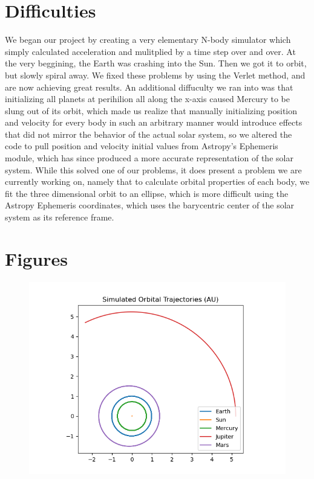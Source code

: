 \documentclass[a4paper,12pt]{article} %
\numberwithin{equation}{section} %
\numberwithin{figure}{section} %
\begin{document}
\section{Difficulties}
\label{sec:difficulties}
We began our project by creating a very elementary N-body simulator which simply calculated acceleration and mulitplied by a time step over and over. At the very beggining, the Earth was crashing into the Sun. Then we got it to orbit, but slowly spiral away. We fixed these problems by using the Verlet method, and are now achieving great results. An additional diffuculty we ran into was that initializing all planets at perihilion all along the x-axis caused Mercury to be slung out of its orbit, which made us realize that manually initializing position and velocity for every body in such an arbitrary manner would introduce effects that did not mirror the behavior of the actual solar system, so we altered the code to pull position and velocity initial values from Astropy's Ephemeris module, which has since produced a more accurate representation of the solar system. While this solved one of our problems, it does present a problem we are currently working on, namely that to calculate orbital properties of each body, we fit the three dimensional orbit to an ellipse, which is more difficult using the Astropy Ephemeris coordinates, which uses the barycentric center of the solar system as its reference frame. 


\section{Figures}
\label{sec:figures}

\begin{figure}[h]
  \includegraphics[width=\linewidth]{trajectory.png}
  \label{fig:trajectory}
\end{figure}
\end{document}

